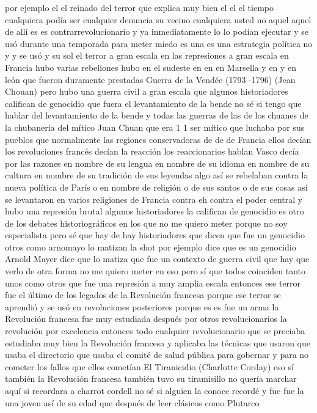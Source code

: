 por ejemplo el el reinado del terror que explica muy bien el el el tiempo cualquiera podía ser cualquier denuncia
su vecino cualquiera usted no aquel aquel de allí es es contrarrevolucionario y ya inmediatamente
lo lo podían ejecutar y se usó durante una temporada para meter miedo es una es una estrategia política no y y se usó
y su sol el terror a gran escala en las represiones a gran escala en Francia hubo varias rebeliones
hubo en el sudeste en en en Marsella y en y en león que fueron duramente prestadas
Guerra de la Vendée (1793 -1796) (Jean Chouan)
pero hubo una guerra civil a gran escala que algunos historiadores califican de genocidio que fuera el levantamiento de la bende
no sé si tengo que hablar del levantamiento de la bende y todas las guerras de las de los chuanes de la chubanería del mítico Juan Chuan
que era 1 1 ser mítico que luchaba por sus pueblos que normalmente las regiones conservadoras de
de de Francia ellos decían los revoluciones francés decían la reacción
los reaccionarios hablan Vasco decía por las razones en nombre de su lengua en nombre de su idioma
en nombre de su cultura en nombre de su tradición de sus leyendas algo así se rebelaban contra la nueva política de París
o en nombre de religión o de sus santos o de sus cosas así se levantaron en varios religiones de Francia
contra eh contra el poder central y hubo una represión brutal algunos historiadores la califican de genocidio
es otro de los debates historiográficos en los que no me quiero meter porque no soy especialista pero sé que hay de hay historiadores que dicen que fue un genocidio
otros como arnomayo lo matizan la shot por ejemplo dice que es un genocidio Arnold Mayer dice que lo matiza
que fue un contexto de guerra civil que hay que verlo de otra forma no me quiero meter en eso pero sí que todos coinciden tanto unos como otros
que fue una represión a muy amplia escala entonces ese terror
fue el último de los legados de la Revolución francesa porque ese terror se aprendió y se usó en revoluciones posteriores
porque es es fue un arma la Revolución francesa fue muy estudiada después por otros revolucionarios la revolución por excelencia
entonces todo cualquier revolucionario que se preciaba estudiaba muy bien la Revolución francesa y aplicaba las técnicas que usaron que usaba el directorio
que usaba el comité de salud pública para gobernar y para no cometer los fallos que ellos cometían
El Tiranicidio (Charlotte Corday)
eso sí también la Revolución francesa también tuvo su tiramisillo no quería marchar aquí si recordara a charrot cordell no sé si alguien la conoce
recordé y fue fue la una joven así de su edad que después de leer clásicos como Plutarco
